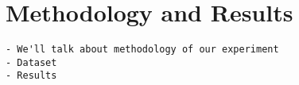 
\section{Methodology and Results}

\begin{verbatim}
- We'll talk about methodology of our experiment
- Dataset
- Results
\end{verbatim}

